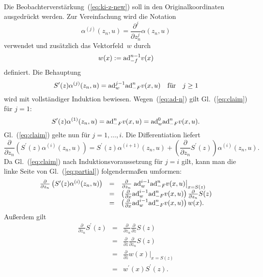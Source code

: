 Die Beobachterverstärkung~(\ref{eq:ki-z-new}) soll in den Originalkoordinaten
ausgedrückt werden. Zur Vereinfachung wird die Notation 
\[
\alpha^{(j)}(z_{n},u)=\frac{\partial^{j}}{\partial z_{n}^{j}}\alpha(z_{n},u)
\]
verwendet und zusätzlich das Vektorfeld~$w$ durch 
\[
w(x):={\operatorname{ad}}_{-f}^{n-1}v(x)
\]
definiert. Die Behauptung 
\begin{equation}
S^{\prime}(z)\alpha^{(j)}(z_{n},u)={\operatorname{ad}}_{w}^{j-1}{\operatorname{ad}}_{-F}^{n}v(x,u)\quad\textrm{für}\quad j\geq1\label{eq:claim}
\end{equation}
wird mit vollständiger Induktion bewiesen. Wegen~(\ref{eq:ad-n})
gilt Gl.~(\ref{eq:claim}) für $j=1$:
\[
S^{\prime}(z)\alpha^{(1)}(z_{n},u)={\operatorname{ad}}_{-F}^{n}v(x,u)={\operatorname{ad}}_{w}^{0}{\operatorname{ad}}_{-F}^{n}v(x,u).
\]
Gl.~(\ref{eq:claim}) gelte nun für $j=1,\ldots,i$. Die Differentiation
liefert 
\begin{equation}
\frac{\partial}{\partial z_{n}}\left(S^{\prime}(z)\alpha^{(i)}(z_{n},u)\right)=S^{\prime}(z)\alpha^{(i+1)}(z_{n},u)+\left(\frac{\partial}{\partial z_{n}}S^{\prime}(z)\right)\alpha^{(i)}(z_{n},u).\label{eq:partial}
\end{equation}
Da Gl.~(\ref{eq:claim}) nach Induktionsvoraussetzung für $j=i$
gilt, kann man die linke Seite von Gl.~(\ref{eq:partial}) folgendermaßen
umformen: 
\begin{equation}
\begin{array}{ccl}
\frac{\partial}{\partial z_{n}}\left(S^{\prime}(z)\alpha^{(i)}(z_{n},u)\right) & = & \frac{\partial}{\partial z_{n}}\left.{\operatorname{ad}}_{w}^{i-1}{\operatorname{ad}}_{-F}^{n}v(x,u)\right|_{x=S(z)}\\
 & = & \left(\frac{\partial}{\partial x}{\operatorname{ad}}_{w}^{i-1}{\operatorname{ad}}_{-F}^{n}v(x,u)\right)\frac{\partial}{\partial z_{n}}S(z)\\
 & = & \left(\frac{\partial}{\partial x}{\operatorname{ad}}_{w}^{i-1}{\operatorname{ad}}_{-F}^{n}v(x,u)\right)w(x).
\end{array}\label{eq:X1}
\end{equation}
Außerdem gilt 
\begin{equation}
\begin{array}{lcl}
\frac{\partial}{\partial z_{n}}S^{\prime}(z) & = & \frac{\partial}{\partial z_{n}}\frac{\partial}{\partial z}S(z)\\
 & = & \frac{\partial}{\partial z}\frac{\partial}{\partial z_{n}}S(z)\\
 & = & \frac{\partial}{\partial z}\left.w(x)\right|_{x=S(z)}\\
 & = & w^{\prime}(x)S^{\prime}(z).
\end{array}\label{eq:NR}
\end{equation}
